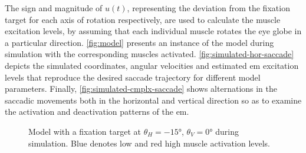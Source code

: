 \documentclass[11pt,a4paper,draft=false]{report}
\begin{document}
The sign and magnitude of $u(t)$, representing the deviation from
the fixation target for each axis of rotation respectively, are used to
calculate the muscle excitation levels, by assuming that each individual muscle
rotates the eye globe in a particular direction. \autoref{fig:model} presents an
instance of the model during simulation with the corresponding muscles
activated. \autoref{fig:simulated-hor-saccade} depicts the simulated
coordinates, angular velocities and estimated \gls{em} excitation levels that
reproduce the desired saccade trajectory for different model
parameters. Finally, \autoref{fig:simulated-cmplx-saccade} shows alternations in
the saccadic movements both in the horizontal and vertical direction so as to
examine the activation and deactivation patterns of the \gls{em}.

\begin{figure}[ht]
  \centering
  \hspace{3cm}
  \caption{Model with a fixation target at $\theta_H = -15 \si{\degree}$,
    $\theta_V = 0 \si{\degree}$ during simulation. Blue denotes low and red high
    muscle activation levels.}\label{fig:model}
\end{figure}
\end{document}
